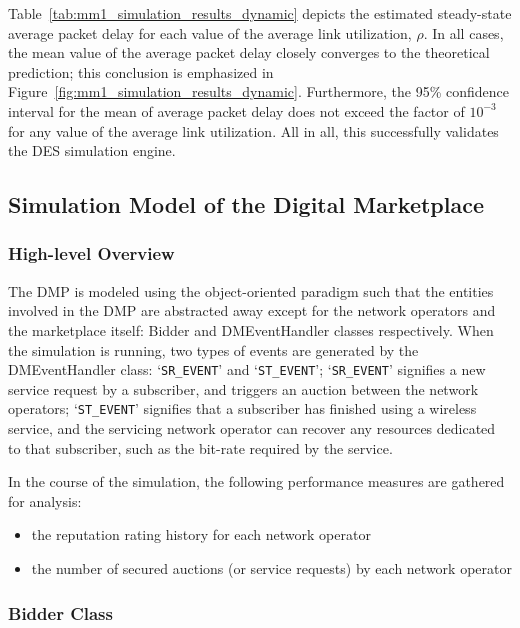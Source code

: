 Table~\ref{tab:mm1_simulation_results_dynamic} depicts the estimated steady-state average packet delay for each value of the average link utilization, $\rho$. In all cases, the mean value of the average packet delay closely converges to the theoretical prediction; this conclusion is emphasized in Figure~\ref{fig:mm1_simulation_results_dynamic}. Furthermore, the 95\% confidence interval for the mean of average packet delay does not exceed the factor of $10^{-3}$ for any value of the average link utilization. All in all, this successfully validates the DES simulation engine.

\subsection{Simulation Model of the Digital Marketplace} %
\label{sub:simulation_model_of_the_digital_marketplace_dynamic}

\subsubsection{High-level Overview} %
\label{ssub:high_level_overview_dynamic}
The DMP is modeled using the object-oriented paradigm such that the entities involved in the DMP are abstracted away except for the network operators and the marketplace itself: Bidder and DMEventHandler classes respectively. When the simulation is running, two types of events are generated by the DMEventHandler class: `\lstinline!SR_EVENT!' and `\lstinline!ST_EVENT!'; `\lstinline!SR_EVENT!' signifies a new service request by a subscriber, and triggers an auction between the network operators; `\lstinline!ST_EVENT!' signifies that a subscriber has finished using a wireless service, and the servicing network operator can recover any resources dedicated to that subscriber, such as the bit-rate required by the service.

In the course of the simulation, the following performance measures are gathered for analysis:
\begin{itemize}
	\item the reputation rating history for each network operator
	\item the number of secured auctions (or service requests) by each network operator
\end{itemize}

\subsubsection{Bidder Class} %
\label{ssub:bidder_class_dynamic}

